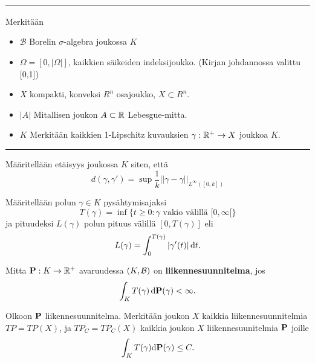 

\hrule $\color{white}{.}$ \\
Merkitään 
\begin{itemize}
    \item $\mathcal{B}$ Borelin $\sigma$-algebra joukossa $K$
    \item $\Omega = [0,|\Omega|]$, kaikkien säikeiden indeksijoukko. (Kirjan johdannossa valittu [0,1])
    \item $X$ kompakti, konveksi $R^n$ osajoukko, $X \subset R^n$.
    \item $|A|$ Mitallisen joukon $A\subset \R$ Lebesgue-mitta.
    \item $K$ Merkitään kaikkien 1-Lipschitz kuvauksien $\gamma:\R^+ \to X$ joukkoa $K$. 
\end{itemize}
\hrule


\begin{definition}
    Määritellään etäisyys joukossa $K$ siten, että
    \[d(\gamma, \gamma') = \sup \frac{1}{k}||\gamma - \gamma||_{L^\infty([0,k])}\]
\end{definition}

\begin{definition}
    Määritellään polun $\gamma \in K$ pysähtymisajaksi 
    \begin{equation*}
        T(\gamma) = \inf\{t\ge0:\gamma \text{ vakio välillä } [0,\infty[ \}
    \end{equation*}
    ja pituudeksi $L(\gamma)$ polun pituus välillä $[0, T(\gamma)]$ eli
     \begin{equation*}
         L(\gamma) = \int_0^{T(\gamma)}|\gamma'(t)|\, \dt.
     \end{equation*}
    
\end{definition}

\begin{definition}\label{def:liikennesuunnitelma}
    Mitta $\P: K \to \R^+$ avaruudessa  $(K, \Borel)$ on \textbf{liikennesuunnitelma}, jos
    \begin{equation*}
     \int_K T(\gamma) \, \d \P (\gamma) < \infty.   
    \end{equation*}
\end{definition}

\begin{definition}
    Olkoon $\P$ liikennesuunnitelma. Merkitään joukon $X$ kaikkia liikennesuunnitelmia $TP = TP(X)$, ja $TP_C = TP_C(X)$ kaikkia joukon $X$ liikennesuunitelmia $\P$ joille
    \begin{equation*}
        \int_K T(\gamma) \d \P(\gamma) \le C.
    \end{equation*}
\end{definition}

